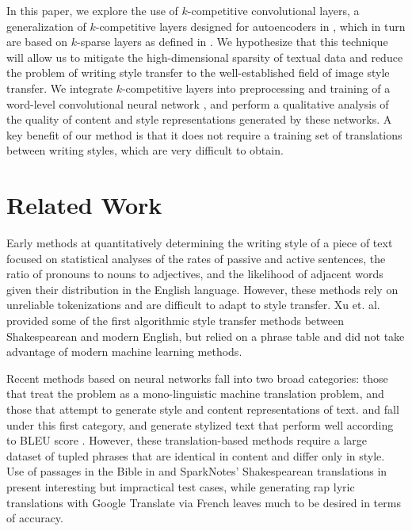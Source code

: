 \documentclass{vldb}
\begin{document}
In this paper, we explore the use of $k$-competitive convolutional layers, a generalization of $k$-competitive layers designed for autoencoders in \cite{KATE}, which in turn are based on $k$-sparse layers as defined in \cite{MakhzaniF13}. We hypothesize that this technique will allow us to mitigate the high-dimensional sparsity of textual data and reduce the problem of writing style transfer to the well-established field of image style transfer. We integrate $k$-competitive layers into preprocessing and training of a word-level convolutional neural network \cite{Kim14f}, and perform a qualitative analysis of the quality of content and style representations generated by these networks. A key benefit of our method is that it does not require a training set of translations between writing styles, which are very difficult to obtain.

\section{Related Work}
Early methods at quantitatively determining the writing style of a piece of text focused on statistical analyses of the rates of passive and active sentences, the ratio of pronouns to nouns to adjectives, and the likelihood of adjacent words given their distribution in the English language. However, these methods rely on unreliable tokenizations and are difficult to adapt to style transfer. Xu et. al. \cite{Xu12} provided some of the first algorithmic style transfer methods between Shakespearean and modern English, but relied on a phrase table and did not take advantage of modern machine learning methods. 

Recent methods based on neural networks fall into two broad categories: those that treat the problem as a mono-linguistic machine translation problem, and those that attempt to generate style and content representations of text.  \cite{Carlson17} and \cite{Jang16} fall under this first category, and generate stylized text that perform well according to BLEU score \cite{Papineni02}. However, these translation-based methods require a large dataset of tupled phrases that are identical in content and differ only in style. Use of passages in the Bible in \cite{Carlson17} and SparkNotes' Shakespearean translations in \cite{Jang16} present interesting but impractical test cases, while generating rap lyric translations with Google Translate via French \cite{Jang16} leaves much to be desired in terms of accuracy. 
\end{document}
